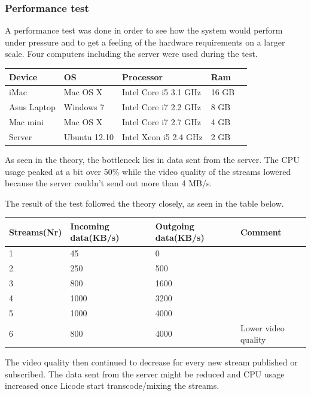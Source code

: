 \documentclass[12pt, titlepage]{article}
\begin{document}
\subsubsection{Performance test}

A performance test was done in order to see how the system would perform under pressure and to get a feeling of the hardware requirements on a larger scale. Four computers including the server were used during the test.
\begin{center}
    \begin{tabular}{| l | l | l | l | l |}
    \hline
    Device & OS & Processor & Ram \\ \hline
    iMac & Mac OS X & Intel Core i5 3.1 GHz & 16 GB\\ \hline
    Asus Laptop & Windows 7 & Intel Core i7 2.2 GHz & 8 GB \\ \hline
    Mac mini & Mac OS X & Intel Core i7 2.7 GHz & 4 GB \\ \hline
    Server & Ubuntu 12.10 & Intel Xeon i5 2.4 GHz & 2 GB\\ \hline
    \end{tabular}
\end{center}
As seen in the theory, the bottleneck lies in data sent from the server. The CPU usage peaked at a bit over 50\% while the video quality of the streams lowered because the server couldn't send out more than 4 MB/s.

The result of the test followed the theory closely, as seen in the table below.

\begin{center}
    \begin{tabularx}{\textwidth}{|X|X|X|l|}
    \hline
    Streams(Nr) & Incoming data(KB/s) & Outgoing data(KB/s) & Comment \\ \hline
    1 & 45 & 0 & \\ \hline
    2 & 250 & 500 & \\ \hline
    3 & 800 & 1600 & \\ \hline
    4 & 1000 & 3200 &\\ \hline
    5 & 1000 & 4000 &\\ \hline
    6 & 800 & 4000 & Lower video quality\\ \hline
    \end{tabularx}
\end{center}

The video quality then continued to decrease for every new stream published or subscribed. The data sent from the server might be reduced and CPU usage increased once Licode start transcode/mixing the streams.
\end{document}
